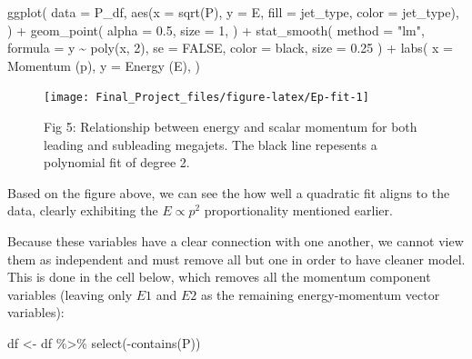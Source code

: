 \documentclass[
]{article}
\newenvironment{Shaded}{\begin{snugshade}}{\end{snugshade}}
\newcommand{\AttributeTok}[1]{\textcolor[rgb]{0.77,0.63,0.00}{#1}}
\newcommand{\ConstantTok}[1]{\textcolor[rgb]{0.00,0.00,0.00}{#1}}
\newcommand{\DecValTok}[1]{\textcolor[rgb]{0.00,0.00,0.81}{#1}}
\newcommand{\FloatTok}[1]{\textcolor[rgb]{0.00,0.00,0.81}{#1}}
\newcommand{\FunctionTok}[1]{\textcolor[rgb]{0.00,0.00,0.00}{#1}}
\newcommand{\NormalTok}[1]{#1}
\newcommand{\OtherTok}[1]{\textcolor[rgb]{0.56,0.35,0.01}{#1}}
\newcommand{\SpecialCharTok}[1]{\textcolor[rgb]{0.00,0.00,0.00}{#1}}
\newcommand{\StringTok}[1]{\textcolor[rgb]{0.31,0.60,0.02}{#1}}
\begin{document}
\begin{Shaded}
\begin{Highlighting}[]
\FunctionTok{ggplot}\NormalTok{(}
  \AttributeTok{data =}\NormalTok{ P\_df, }
  \FunctionTok{aes}\NormalTok{(}\AttributeTok{x =} \FunctionTok{sqrt}\NormalTok{(P), }\AttributeTok{y =}\NormalTok{ E, }\AttributeTok{fill =}\NormalTok{ jet\_type, }\AttributeTok{color =}\NormalTok{ jet\_type), }
\NormalTok{) }\SpecialCharTok{+}
  \FunctionTok{geom\_point}\NormalTok{(}
    \AttributeTok{alpha =} \FloatTok{0.5}\NormalTok{,}
    \AttributeTok{size =} \DecValTok{1}\NormalTok{,}
\NormalTok{  ) }\SpecialCharTok{+} 
  \FunctionTok{stat\_smooth}\NormalTok{(}
    \AttributeTok{method =} \StringTok{"lm"}\NormalTok{,}
    \AttributeTok{formula =}\NormalTok{ y }\SpecialCharTok{\textasciitilde{}} \FunctionTok{poly}\NormalTok{(x, }\DecValTok{2}\NormalTok{),}
    \AttributeTok{se =} \ConstantTok{FALSE}\NormalTok{,}
    \AttributeTok{color =} \StringTok{\textquotesingle{}black\textquotesingle{}}\NormalTok{,}
    \AttributeTok{size =} \FloatTok{0.25}
\NormalTok{  ) }\SpecialCharTok{+}
    \FunctionTok{labs}\NormalTok{(}
      \AttributeTok{x =} \StringTok{\textquotesingle{}Momentum (p)\textquotesingle{}}\NormalTok{,}
      \AttributeTok{y =} \StringTok{\textquotesingle{}Energy (E)\textquotesingle{}}\NormalTok{,}
\NormalTok{    )}
\end{Highlighting}
\end{Shaded}

\begin{figure}

{\centering \texttt{[image: Final\_Project\_files/figure-latex/Ep-fit-1]} 

}

\caption{Fig 5: Relationship between energy and scalar momentum for both leading and subleading megajets. The black line repesents a polynomial fit of degree 2.}\label{fig:Ep-fit}
\end{figure}

Based on the figure above, we can see the how well a quadratic fit
aligns to the data, clearly exhibiting the \(E \propto p^2\)
proportionality mentioned earlier.

Because these variables have a clear connection with one another, we
cannot view them as independent and must remove all but one in order to
have cleaner model. This is done in the cell below, which removes all
the momentum component variables (leaving only \(E1\) and \(E2\) as the
remaining energy-momentum vector variables):

\begin{Shaded}
\begin{Highlighting}[]
\NormalTok{df }\OtherTok{\textless{}{-}}\NormalTok{ df }\SpecialCharTok{\%\textgreater{}\%}
  \FunctionTok{select}\NormalTok{(}\SpecialCharTok{{-}}\FunctionTok{contains}\NormalTok{(}\StringTok{\textquotesingle{}P\textquotesingle{}}\NormalTok{))}
\end{Highlighting}
\end{Shaded}
\end{document}
